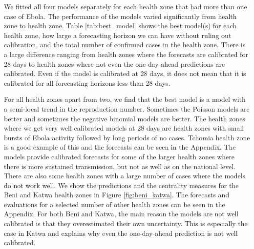 \documentclass[12pt]{article}
\begin{document}
We fitted all four models separately for each health zone that had more than one case of Ebola. The performance of the models varied significantly from health zone to health zone. Table \ref{tab:best_model} shows the best model(s) for each health zone, how large a forecasting horizon we can have without ruling out calibration, and the total number of confirmed cases in the health zone. There is a large difference ranging from health zones where the forecasts are calibrated for 28 days to health zones where not even the one-day-ahead predictions are calibrated. Even if the model is calibrated at 28 days, it does not mean that it is calibrated for all forecasting horizons less than 28 days. 




For all health zones apart from two, we find that the best model is a model with a semi-local trend in the reproduction number. Sometimes the Poisson models are better and sometimes the negative binomial models are better. The health zones where we get very well calibrated models at 28 days are health zones with small bursts of Ebola activity followed by long periods of no cases. Tchomia health zone is a good example of this and the forecasts can be seen in the Appendix. The models provide calibrated forecasts for some of the larger health zones where there is more sustained transmission, but not as well as on the national level. There are also some health zones with a large number of cases where the models do not work well. We show the predictions and the centrality measures for the Beni and Katwa health zones in Figure \ref{fig:beni_katwa}. The forecasts and evaluations for a selected number of other health zones can be seen in the Appendix. For both Beni and Katwa, the main reason the models are not well calibrated is that they overestimated their own uncertainty. This is especially the case in Katwa and explains why even the one-day-ahead prediction is not well calibrated. 
\end{document}
